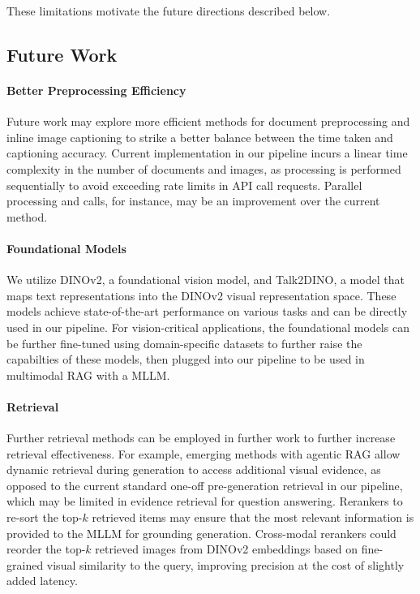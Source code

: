 \noindent
These limitations motivate the future directions described below.


\subsection{Future Work}

\paragraph{Better Preprocessing Efficiency}
Future work may explore more efficient methods for document preprocessing and inline image captioning to strike a better balance 
between the time taken and captioning accuracy.
Current implementation in our pipeline incurs a linear time complexity in the number of documents and images,
as processing is performed sequentially to avoid exceeding rate limits in API call requests.
Parallel processing and calls, for instance, may be an improvement over the current method.

\paragraph{Foundational Models}
We utilize DINOv2, a foundational vision model, and Talk2DINO, a model that maps text representations into the DINOv2 visual representation space.
These models achieve state-of-the-art performance on various tasks and can be directly used in our pipeline.
For vision-critical applications, the foundational models can be further fine-tuned using domain-specific datasets 
to further raise the capabilties of these models, then plugged into our pipeline to be used in multimodal RAG with a MLLM.

\paragraph{Retrieval}
Further retrieval methods can be employed in further work to further increase retrieval effectiveness.
For example, emerging methods with agentic RAG \cite{gao2026scalingcontextsurveymultimodal} allow dynamic retrieval during generation to access additional visual evidence,
as opposed to the current standard one-off pre-generation retrieval in our pipeline, which may be limited in evidence retrieval for question answering.
Rerankers to re-sort the top-$k$ retrieved items may ensure that the most relevant information is provided to the MLLM for grounding generation.
Cross-modal rerankers could reorder the top-$k$ retrieved images from DINOv2 embeddings based on fine-grained visual similarity to the query,
improving precision at the cost of slightly added latency.

